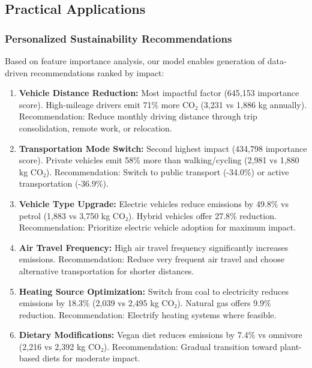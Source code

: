\documentclass[12pt,a4paper]{article}
\begin{document}
\subsection{Practical Applications}

\subsubsection{Personalized Sustainability Recommendations}
Based on feature importance analysis, our model enables generation of data-driven recommendations ranked by impact:

\begin{enumerate}
    \item \textbf{Vehicle Distance Reduction:} Most impactful factor (645,153 importance score). High-mileage drivers emit 71\% more CO₂ (3,231 vs 1,886 kg annually). Recommendation: Reduce monthly driving distance through trip consolidation, remote work, or relocation.
    
    \item \textbf{Transportation Mode Switch:} Second highest impact (434,798 importance score). Private vehicles emit 58\% more than walking/cycling (2,981 vs 1,880 kg CO₂). Recommendation: Switch to public transport (-34.0\%) or active transportation (-36.9\%).
    
    \item \textbf{Vehicle Type Upgrade:} Electric vehicles reduce emissions by 49.8\% vs petrol (1,883 vs 3,750 kg CO₂). Hybrid vehicles offer 27.8\% reduction. Recommendation: Prioritize electric vehicle adoption for maximum impact.
    
    \item \textbf{Air Travel Frequency:} High air travel frequency significantly increases emissions. Recommendation: Reduce very frequent air travel and choose alternative transportation for shorter distances.
    
    \item \textbf{Heating Source Optimization:} Switch from coal to electricity reduces emissions by 18.3\% (2,039 vs 2,495 kg CO₂). Natural gas offers 9.9\% reduction. Recommendation: Electrify heating systems where feasible.
    
    \item \textbf{Dietary Modifications:} Vegan diet reduces emissions by 7.4\% vs omnivore (2,216 vs 2,392 kg CO₂). Recommendation: Gradual transition toward plant-based diets for moderate impact.
\end{enumerate}
\end{document}
